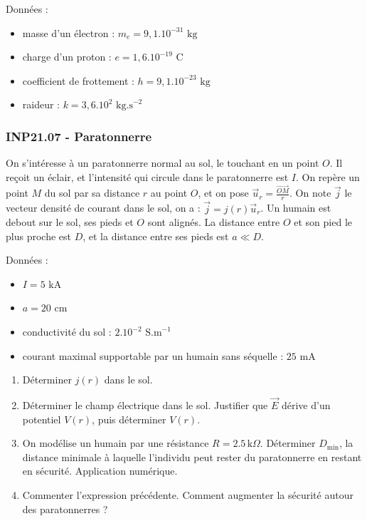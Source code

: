 Données :
\begin{itemize}
\item masse d'un électron : $m_e=9,1.10^{-31}\text{ kg}$
\item charge d'un proton : $e=1,6.10^{-19}\text{ C}$
\item coefficient de frottement : $h=9,1.10^{-23}\text{ kg}$
\item raideur : $k=3,6.10^2 \text{ kg.s}^{-2}$
\end{itemize}


\newpage
\subsubsection*{INP21.07 - Paratonnerre  \corrige}

On s'intéresse à un paratonnerre normal au sol, le touchant en un point $O$. Il reçoit un éclair, et l'intensité qui circule dans le paratonnerre est $I$. On repère un point $M$ du sol par sa distance $r$ au point $O$, et on pose $\overrightarrow{u}_r = \frac{\overrightarrow{OM}}{r}$. On note $\overrightarrow{j}$ le vecteur densité de courant dans le sol, on a : $\overrightarrow{j} = j(r) \overrightarrow{u}_r$. Un humain est debout sur le sol, ses pieds et $O$ sont alignés. La distance entre $O$ et son pied le plus proche est $D$, et la distance entre ses pieds est $a \ll D$.

Données :
\begin{itemize}
\item $I=5\text{ kA}$
\item $a=20\text{ cm}$
\item conductivité du sol : $2.10^{-2}\text{ S.m}^{-1}$
\item courant maximal supportable par un humain sans séquelle : $25\text{ mA}$
\end{itemize}


\begin{enumerate}
    \item Déterminer $j(r)$ dans le sol.
    \item Déterminer le champ électrique dans le sol. Justifier que $\overrightarrow{E}$ dérive d'un potentiel $V(r)$, puis déterminer $V(r)$.
    \item On modélise un humain par une résistance $R = 2.5\, \text{k}\Omega$. Déterminer $D_{\min}$, la distance minimale à laquelle l'individu peut rester du paratonnerre en restant en sécurité. Application numérique.
    \item Commenter l'expression précédente. Comment augmenter la sécurité autour des paratonnerres ?
\end{enumerate}

